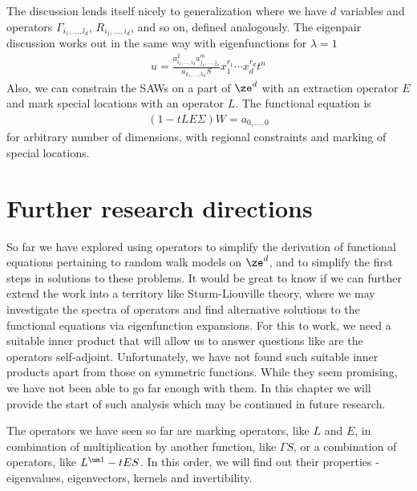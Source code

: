 \begin{example}
The discussion lends itself nicely to generalization where we have $d$ variables and operators $\Gamma_{i_1,\ldots,l_d}$, $R_{i_1,\ldots,i_d}$, and so on, defined analogously. The eigenpair discussion works out in the same way with eigenfunctions for $\lambda = 1$
\begin{align}
	u = \frac{a_{i_1,\ldots,i_d}^2 a_{j_1,\ldots,j_d}^m}{a_{k_1,\ldots,k_d}S}x_1^{r_1}\cdots x_d^{r_d} t^n
\end{align}
Also, we can constrain the SAWs on a part of $\ze^d$ with an extraction operator $E$ and mark special locations with an operator $L$. The functional equation is
\begin{align}
	(1- tLE\Sigma)W = a_{0,\ldots,0}
\end{align}
for arbitrary number of dimensions, with regional constraints and marking of special locations.
\end{example}

\section{Further research directions}

So far we have explored using operators to simplify the derivation of functional equations pertaining to random walk models on $\ze^d$, and to simplify the first steps in solutions to these problems. It would be great to know if we can further extend the work into a territory like Sturm-Liouville theory, where we may investigate the spectra of operators and find alternative solutions to the functional equations via eigenfunction expansions. For this to work, we need a suitable inner product that will allow us to answer questions like are the operators self-adjoint. Unfortunately, we have not found such suitable inner products apart from those on symmetric functions. While they seem promising, we have not been able to go far enough with them. In this chapter we will provide the start of such analysis which may be continued in future research.

The operators we have seen so far are marking operators, like $L$ and $E$, in combination of multiplication by another function, like $\Gamma S$, or a combination of operators, like $L^{\um 1} - tES$. In this order, we will find out their properties - eigenvalues, eigenvectors, kernels and invertibility.


